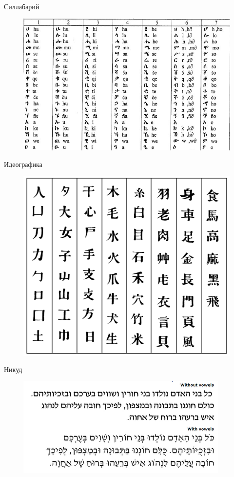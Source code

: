 \documentclass{beamer}
\begin{document}
\begin{frame}{Силлабарий}
\begin{figure}[H]
    \includegraphics[scale=0.45]{amharic.png} 
\end{figure}
\end{frame}

\begin{frame}{Идеографика}
\begin{figure}[H]
    \includegraphics[scale=0.6]{ideographic.png} 
\end{figure}
\end{frame}

\begin{frame}{Никуд}
\begin{figure}[H]
    \includegraphics[scale=0.6]{hebrew.png} 
\end{figure}
\end{frame}
\end{document}
